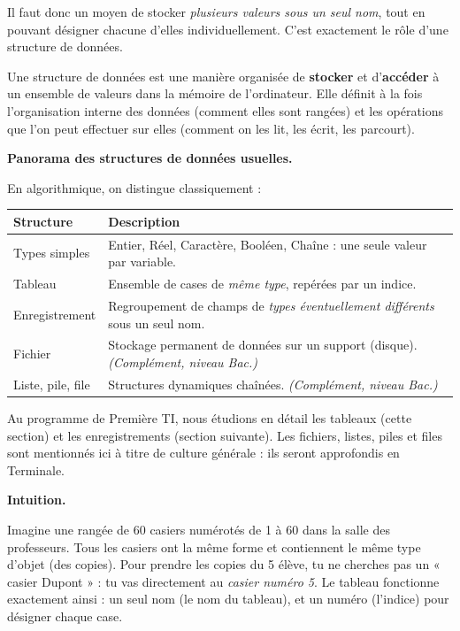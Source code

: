 \documentclass[11pt]{article}
\newcommand{\cle}[1]{{\popxbold\color{popdark}#1}}
\newcounter{popsec}
\newcounter{popsub}
\newcommand{\courssub}[1]{%
  \stepcounter{popsub}%
  \par\vspace{9pt}\noindent{\popxbold\fontsize{11.5}{13}\selectfont\color{popink}{\color{poporange}\thepopsec.\thepopsub}\hspace{6pt}#1}\par\nopagebreak\vspace{4pt}
}
\begin{document}
Il faut donc un moyen de stocker \emph{plusieurs valeurs sous un seul nom}, tout en pouvant désigner chacune d'elles individuellement. C'est exactement le rôle d'une structure de données.

\begin{definition}
Une \cle{structure de données} est une manière organisée de \textbf{stocker} et d'\textbf{accéder} à un ensemble de valeurs dans la mémoire de l'ordinateur. Elle définit à la fois l'organisation interne des données (comment elles sont rangées) et les opérations que l'on peut effectuer sur elles (comment on les lit, les écrit, les parcourt).
\end{definition}

\textbf{Panorama des structures de données usuelles.}\par
En algorithmique, on distingue classiquement :

\begin{center}
\begin{tabularx}{\linewidth}{|l|X|}
\hline
\rowcolor{popblueL} \textbf{Structure} & \textbf{Description} \\
\hline
Types simples & Entier, Réel, Caractère, Booléen, Chaîne : une seule valeur par variable. \\
\hline
Tableau & Ensemble de cases de \emph{même type}, repérées par un indice. \\
\hline
Enregistrement & Regroupement de champs de \emph{types éventuellement différents} sous un seul nom. \\
\hline
Fichier & Stockage permanent de données sur un support (disque). \emph{(Complément, niveau Bac.)} \\
\hline
Liste, pile, file & Structures dynamiques chaînées. \emph{(Complément, niveau Bac.)} \\
\hline
\end{tabularx}
\end{center}

Au programme de Première TI, nous étudions en détail les \cle{tableaux} (cette section) et les \cle{enregistrements} (section suivante). Les fichiers, listes, piles et files sont mentionnés ici à titre de culture générale : ils seront approfondis en Terminale.

\courssub{Le tableau à une dimension}

\textbf{Intuition.}\par
Imagine une rangée de 60 casiers numérotés de 1 à 60 dans la salle des professeurs. Tous les casiers ont la même forme et contiennent le même type d'objet (des copies). Pour prendre les copies du 5 élève, tu ne cherches pas un « casier Dupont » : tu vas directement au \emph{casier numéro 5}. Le tableau fonctionne exactement ainsi : un seul nom (le nom du tableau), et un numéro (l'indice) pour désigner chaque case.
\end{document}
